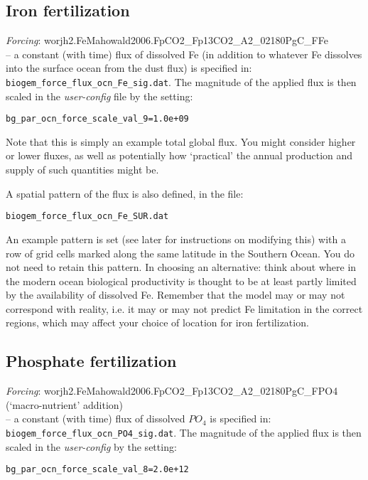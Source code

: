 \documentclass[11pt,fleqn]{book} %
\begin{document}

\subsection{Iron fertilization}

\textit{Forcing}: \textsf{\footnotesize worjh2.FeMahowald2006.FpCO2\_Fp13CO2\_A2\_02180PgC\_FFe} \vspace{1pt}
\\-- a constant (with time) flux of dissolved Fe (in addition to whatever Fe dissolves into the surface ocean from the dust flux) is specified in: \texttt{biogem\_force\_flux\_ocn\_Fe\_sig.dat}. The magnitude of the applied flux is then scaled in the \textit{user-config} file by the setting:
\small\begin{verbatim}
bg_par_ocn_force_scale_val_9=1.0e+09
\end{verbatim}\normalsize
Note that this is simply an example total global flux. You might consider higher or lower fluxes, as well as potentially how ‘practical’ the annual production and supply of such quantities might be.

A spatial pattern of the flux is also defined, in the file:
\small\begin{verbatim}
biogem_force_flux_ocn_Fe_SUR.dat
\end{verbatim}\normalsize

An example pattern is set (see later for instructions on modifying this) with a row of grid cells  marked along the same latitude in the Southern Ocean. You do not need to retain this pattern. In choosing an alternative: think about where in the modern ocean biological productivity is thought to be at least partly limited by the availability of dissolved Fe. Remember that the model may or may not correspond with reality, i.e. it may or may not predict Fe limitation in the correct regions, which may affect your choice of location for iron fertilization.


\subsection{Phosphate fertilization}

\textit{Forcing}: \textsf{\footnotesize worjh2.FeMahowald2006.FpCO2\_Fp13CO2\_A2\_02180PgC\_FPO4} (‘macro-nutrient’ addition) 
\vspace{1pt}
\\ -- a constant (with time) flux of dissolved \(PO_{4}\) is specified in: \texttt{biogem\_force\_flux\_ocn\_PO4\_sig.dat}. The magnitude of the applied flux is then scaled in the \textit{user-config} by the setting:
\vspace{-2pt}\small\begin{verbatim}
bg_par_ocn_force_scale_val_8=2.0e+12 
\end{verbatim}\normalsize\vspace{-2pt}
\end{document}
